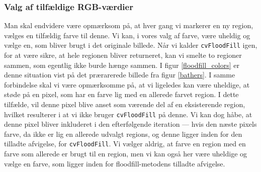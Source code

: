 {\subsubsection{Valg af tilfældige RGB-værdier}
Man skal endvidere være opmærksom på, at hver gang vi markerer en ny
region, vælges en tilfældig farve til denne.  Vi kan, i vores valg af
farve, være uheldig og vælge en, som bliver brugt i det originale
billede. Når vi kalder \texttt{cvFloodFill} igen, for at være sikre, at
hele regionen bliver returneret, kan vi smelte to regioner sammen, som
egentlig ikke burde hænge sammen. I figur \ref{floodfill_colors} er
denne situation vist på det prærarerede billede fra figur \ref{bathers}.
I samme forbindelse skal vi være opmærksomme på, at vi ligeledes kan
være uheldige, at støde på en pixel, som har en farve lig med en
allerede farvet region. I dette tilfælde, vil denne pixel blive anset
som værende del af en eksisterende region, hvilket resulterer i at vi
ikke bruger \texttt{cvFloodFill} på denne. Vi kan dog håbe, at denne
pixel bliver inkluderet i den efterfølgende iteration --- hvis den næste
pixels farve, da ikke er lig en allerede udvalgt regions, og denne
ligger inden for den tilladte afvigelse, for \texttt{cvFloodFill}.  Vi
vælger aldrig, at farve en region med en farve som allerede er brugt til
en region, men vi kan også her være uheldige og vælge en farve, som
ligger inden for floodfill-metodens tilladte afvigelse.

}
